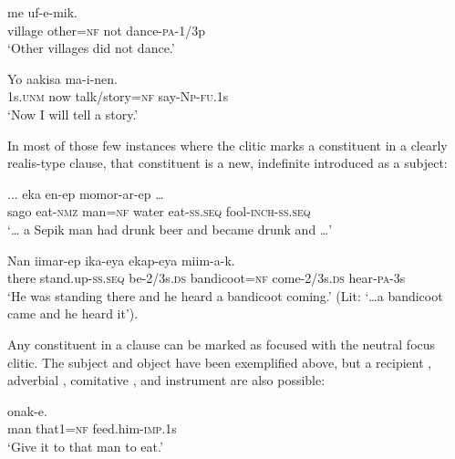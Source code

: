\ea%
\label{ex:9:x1721}
\gll {}    me  uf-e-mik. \\
village  other=\textsc{nf}  not  dance-\textsc{pa}-1/3p      \\
\glt`Other villages did not dance.'
\z


\ea%
\label{ex:9:x1722}
\gll Yo  aakisa    ma-i-nen. \\
1s.\textsc{unm}  now  talk/story=\textsc{nf}  say-\textsc{Np}-\textsc{fu}.1s      \\
\glt`Now I will tell a story.'
\z


In most of those few instances where the  clitic marks a constituent in a clearly realis-type clause, that constituent is a new, indefinite  introduced as a subject:

\ea%
\label{ex:9:x1733}
\gll ...    eka  en-ep  momor-ar-ep  {\dots} \\
sago  eat-\textsc{nmz}  man=\textsc{nf}  water  eat-\textsc{ss}.\textsc{seq}  fool-\textsc{inch}-\textsc{ss}.\textsc{seq}\\
\glt`{\dots} a Sepik man had drunk beer and became drunk and {\dots}'
\z


\ea%
\label{ex:9:x1732}
\gll Nan  iimar-ep  ika-eya    ekap-eya miim-a-k.\\
there  stand.up-\textsc{ss}.\textsc{seq}  be-2/3s.\textsc{ds}  bandicoot=\textsc{nf}  come-2/3s.\textsc{ds} hear-\textsc{pa}-3s     \\
\glt`He was standing there and he heard a bandicoot coming.' (Lit: `{\dots}a bandicoot came and he heard it').
\z


Any constituent in a clause can be marked as focused with the neutral focus clitic. The subject and object have been exemplified above, but a recipient , adverbial , comitative ,  and instrument  are also possible:

\ea%
\label{ex:9:x1723}
\gll {}   onak-e. \\
man  that1=\textsc{nf}  feed.him-\textsc{imp}.1s      \\
\glt`Give it to that man to eat.'
\z


